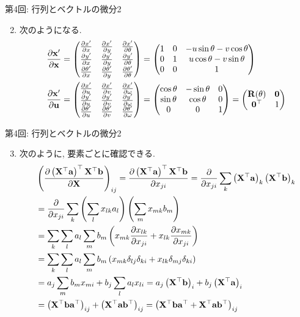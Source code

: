\documentclass[dvipdfmx,notheorems,t]{beamer}
\begin{document}
\begin{frame}{第4回: 行列とベクトルの微分2}
\begin{enumerate}
  \setcounter{enumi}{1}
  \item 次のようになる.
  \begin{align*}
    \pdv{\vb{x}'}{\vb{x}} &= \mqty(\pdv{x'}{x} & \pdv{x'}{y} & \pdv{x'}{\theta} \\
      \pdv{y'}{x} & \pdv{y'}{y} & \pdv{y'}{\theta} \\
      \pdv{\theta'}{x} & \pdv{\theta'}{y} & \pdv{\theta'}{\theta})
      = \mqty(1 & 0 & -u \sin \theta - v \cos \theta \\
        0 & 1 & u \cos \theta - v \sin \theta \\ 0 & 0 & 1) \\
    \pdv{\vb{x}'}{\vb{u}} &= \mqty(\pdv{x'}{u} & \pdv{x'}{v} & \pdv{x'}{\omega} \\
      \pdv{y'}{u} & \pdv{y'}{v} & \pdv{y'}{\omega} \\
      \pdv{\theta'}{u} & \pdv{\theta'}{v} & \pdv{\theta'}{\omega})
      = \mqty(\cos \theta & -\sin \theta & 0 \\
        \sin \theta & \cos \theta & 0 \\ 0 & 0 & 1)
      = \mqty(\vb{R}(\theta) & \vb{0} \\ \vb{0}^\top & 1)
  \end{align*}
\end{enumerate}
\end{frame}

\begin{frame}{第4回: 行列とベクトルの微分2}
\begin{enumerate}
  \setcounter{enumi}{2}
  \item 次のように, 要素ごとに確認できる.
  {\small \begin{align*}
    & \left( \pdv{\left( \vb{X}^\top \vb{a} \right)^\top \vb{X}^\top \vb{b}}{\vb{X}} \right)_{ij}
      = \pdv{\left( \vb{X}^\top \vb{a} \right)^\top \vb{X}^\top \vb{b}}{x_{ji}}
      = \pdv{x_{ji}} \sum_k \left( \vb{X}^\top \vb{a} \right)_k \left( \vb{X}^\top \vb{b} \right)_k \\
      &= \pdv{x_{ji}} \sum_k \left( \sum_l x_{lk} a_l \right) \left( \sum_m x_{mk} b_m \right) \\
      &= \sum_k \sum_l a_l \sum_m b_m
        \left( x_{mk} \pdv{x_{lk}}{x_{ji}} + x_{lk} \pdv{x_{mk}}{x_{ji}} \right) \\
      &= \sum_k \sum_l a_l \sum_m b_m
        \left( x_{mk} \delta_{lj} \delta_{ki} + x_{lk} \delta_{mj} \delta_{ki} \right) \\
      &= a_j \sum_m b_m x_{mi} + b_j \sum_l a_l x_{li}
      = a_j \left( \vb{X}^\top \vb{b} \right)_i + b_j \left( \vb{X}^\top \vb{a} \right)_i \\
      &= \left( \vb{X}^\top \vb{b} \vb{a}^\top \right)_{ij}
        + \left( \vb{X}^\top \vb{a} \vb{b}^\top \right)_{ij}
      = \left( \vb{X}^\top \vb{b} \vb{a}^\top + \vb{X}^\top \vb{a} \vb{b}^\top \right)_{ij}
  \end{align*}}
\end{enumerate}
\end{frame}
\end{document}

